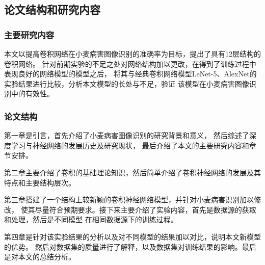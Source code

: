\subsection{\hei\xiaosan\textbf{论文结构和研究内容}}
  \subsubsection{\hei\sihao\textbf{主要研究内容}}
    本文以提高卷积网络在小麦病害图像识别的准确率为目标，提出了具有12层结构的卷积网络。
    针对前期实验的不足之处对网络结构加以更改，在得到了训练过程中表现良好的网络模型的模型之后，
    将其与经典卷积网络模型LeNet-5、AlexNet的实验结果进行比较，分析本文模型的长处与不足，验证
    该模型在小麦病害图像识别中的有效性。
    

  \subsubsection{\hei\sihao\textbf{论文结构}}
    第一章是引言，首先介绍了小麦病害图像识别的研究背景和意义，
    然后综述了深度学习与神经网络的发展历史及研究现状，
    最后介绍了本文的主要研究内容和章节安排。

    第二章主要介绍了卷积的基础理论知识，然后简单介绍了卷积神经网络的发展及其特点和主要结构层次。

    第三章搭建了一个结构上较新颖的卷积神经网络模型，并针对小麦病害识别加以修改，
    使其尽量符合预期要求。接下来主要介绍了实验内容，首先是数据源的获取和处理，然后是不同模型
    在相同数据源下的训练过程。

    第四章是针对该实验结果的分析以及对不同模型的结果加以对比，说明本文新模型的优势。
    然后对数据集的质量进行了解释，以及数据集对训练结果的影响。最后是对本文的总结分析。